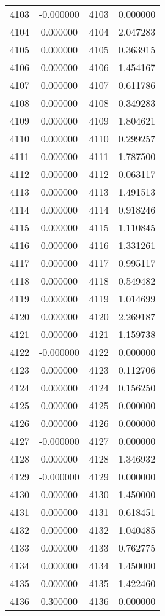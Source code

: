 \documentclass[12pt]{article}
\begin{document}
\begin{longtable}{@{}cccc@{}}
4103 & -0.000000 & 4103 & 0.000000 \\
4104 & 0.000000 & 4104 & 2.047283 \\
4105 & 0.000000 & 4105 & 0.363915 \\
4106 & 0.000000 & 4106 & 1.454167 \\
4107 & 0.000000 & 4107 & 0.611786 \\
4108 & 0.000000 & 4108 & 0.349283 \\
4109 & 0.000000 & 4109 & 1.804621 \\
4110 & 0.000000 & 4110 & 0.299257 \\
4111 & 0.000000 & 4111 & 1.787500 \\
4112 & 0.000000 & 4112 & 0.063117 \\
4113 & 0.000000 & 4113 & 1.491513 \\
4114 & 0.000000 & 4114 & 0.918246 \\
4115 & 0.000000 & 4115 & 1.110845 \\
4116 & 0.000000 & 4116 & 1.331261 \\
4117 & 0.000000 & 4117 & 0.995117 \\
4118 & 0.000000 & 4118 & 0.549482 \\
4119 & 0.000000 & 4119 & 1.014699 \\
4120 & 0.000000 & 4120 & 2.269187 \\
4121 & 0.000000 & 4121 & 1.159738 \\
4122 & -0.000000 & 4122 & 0.000000 \\
4123 & 0.000000 & 4123 & 0.112706 \\
4124 & 0.000000 & 4124 & 0.156250 \\
4125 & 0.000000 & 4125 & 0.000000 \\
4126 & 0.000000 & 4126 & 0.000000 \\
4127 & -0.000000 & 4127 & 0.000000 \\
4128 & 0.000000 & 4128 & 1.346932 \\
4129 & -0.000000 & 4129 & 0.000000 \\
4130 & 0.000000 & 4130 & 1.450000 \\
4131 & 0.000000 & 4131 & 0.618451 \\
4132 & 0.000000 & 4132 & 1.040485 \\
4133 & 0.000000 & 4133 & 0.762775 \\
4134 & 0.000000 & 4134 & 1.450000 \\
4135 & 0.000000 & 4135 & 1.422460 \\
4136 & 0.300000 & 4136 & 0.000000 \\

\end{longtable}
\end{document}
